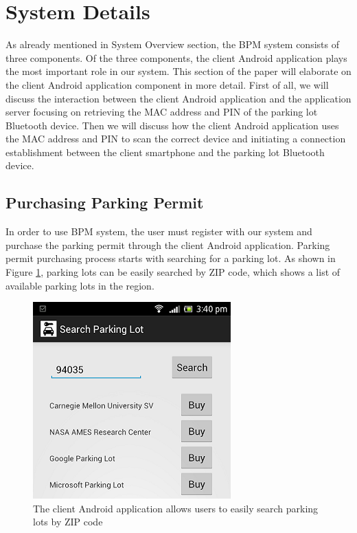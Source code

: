 \section{System Details}
As already mentioned in System Overview section, the BPM system consists of three components. Of the three components, the client Android application plays the most important role in our system. This section of the paper will elaborate on the client Android application component in more detail. First of all, we will discuss the interaction between the client Android application and the application server focusing on retrieving the MAC address and PIN of the parking lot Bluetooth device. Then we will discuss how the client Android application uses the MAC address and PIN to scan the correct device and initiating a connection establishment between the client smartphone and the parking lot Bluetooth device.

\subsection{Purchasing Parking Permit}
In order to use BPM system, the user must register with our system and purchase the parking permit through the client Android application. Parking permit purchasing process starts with searching for a parking lot. As shown in Figure \ref{fig:searching}, parking lots can be easily searched by ZIP code, which shows a list of available parking lots in the region.

\begin{figure}[ht]
	\centering
		\includegraphics[width=3in]{figure/sys_detail_search.png}
		\caption{The client Android application allows users to easily search parking lots by ZIP code}
	\label{fig:searching}
\end{figure}

